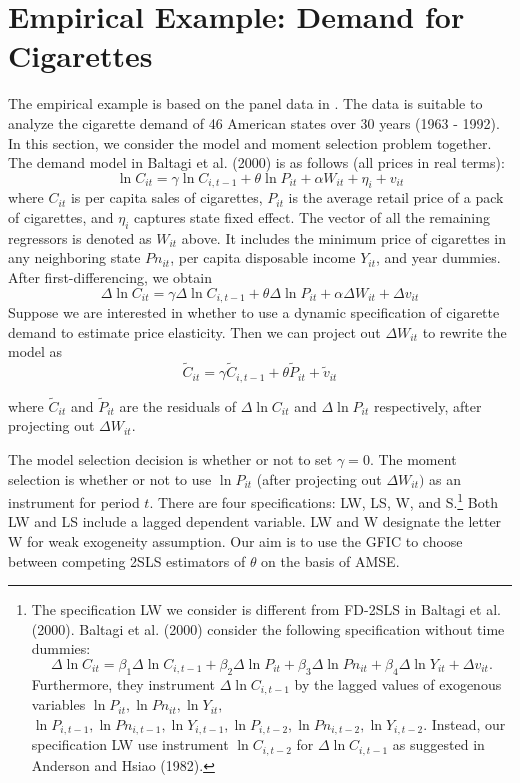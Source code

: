 \section{Empirical Example: Demand for Cigarettes}
\label{sec:cigarettes}


The empirical example is based on the panel data in \cite{BaltagiEtAl2000}. The data is suitable to analyze the cigarette demand of 46 American states over 30 years (1963 - 1992). In this section, we consider the model and moment selection problem together. The demand model in Baltagi et al. (2000) is as follows (all prices in real terms): 
\[
\ln C_{it} =  \gamma \ln C_{i,t-1} + \theta \ln P_{it} + \alpha W_{it} + \eta_i +  v_{it}
\] 
where $C_{it}$ is per capita sales of cigarettes, $P_{it}$ is the average retail price of a pack of cigarettes, and $\eta_i$ captures state fixed effect. The vector of all the remaining regressors is denoted as $W_{it}$ above. It includes the minimum price of cigarettes in any neighboring state $Pn_{it}$, per capita disposable income $Y_{it}$, and year dummies. After first-differencing, we obtain 
\[
\Delta \ln C_{it} = \gamma \Delta \ln C_{i,t-1} +  \theta \Delta \ln P_{it} +\alpha \Delta W_{it} +  \Delta v_{it}
\]
 Suppose we are interested in whether to use a dynamic specification of cigarette demand to estimate price elasticity. Then we can project out $\Delta W_{it}$ to rewrite the model as
\[
\widetilde{C}_{it} = \gamma \widetilde{C}_{i,t-1} + \theta \widetilde{P}_{it} + \widetilde{v}_{it} 
\] 
 
 where $\widetilde{C}_{it}$ and $\widetilde{P}_{it}$ are the residuals of $\Delta \ln C_{it}$ and $\Delta \ln P_{it}$ respectively, after projecting out $\Delta W_{it}$.
 
The model selection decision is whether or not to set $\gamma = 0$. The moment selection is whether or not to use $\ln P_{it}$ (after projecting out $\Delta W_{it})$ as an instrument for period $t$.  There are four specifications:  LW, LS, W, and S.\footnote{The specification LW we consider is different from FD-2SLS in Baltagi et al. (2000). Baltagi et al. (2000) consider the following specification without time dummies:
 \[
\Delta \ln C_{it} = \beta_1 \Delta \ln C_{i,t-1} +  \beta_2 \Delta \ln P_{it} +\beta_3 \Delta \ln Pn_{it} +  \beta_4 \Delta \ln Y_{it} + \Delta v_{it}.
\]
Furthermore, they instrument $\Delta \ln C_{i,t-1}$ by the lagged values of exogenous variables $\ln P_{it}, \ln Pn_{it}, \ln Y_{it},$ $\ln P_{i,t-1}, \ln Pn_{i,t-1}, \ln Y_{i,t-1}, \ln P_{i,t-2}, \ln Pn_{i,t-2}, \ln Y_{i,t-2}$. Instead, our specification LW use instrument $\ln C_{i, t-2}$ for $\Delta \ln C_{i,t-1}$ as suggested in Anderson and Hsiao (1982).}
 Both LW and LS include a lagged dependent variable. LW and W designate the letter W for weak exogeneity assumption. Our aim is to use the GFIC to choose between competing 2SLS estimators of $\theta$ on the basis of AMSE. %
\newpage


